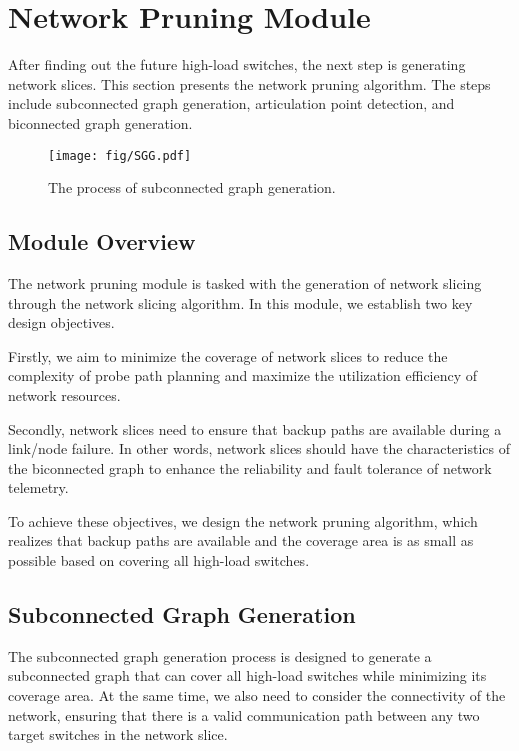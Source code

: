 \documentclass[journal]{IEEEtran}
\begin{document}
\vspace{-0.5em}
\section{Network Pruning Module}
\label{section5}
After finding out the future high-load switches, the next step is generating network slices. This section presents the network pruning algorithm. The steps include subconnected graph generation, articulation point detection, and biconnected graph generation.

\begin{figure*}[htbp]
\centering
\setlength{\abovecaptionskip}{0.cm}

\texttt{[image: fig/SGG.pdf]}
\caption{The process of subconnected graph generation. }
\label{fig6}
\vspace{-0.1cm}
\end{figure*}
\vspace{-1em}
\subsection{Module Overview}
The network pruning module is tasked with the generation of network slicing through the network slicing algorithm.   In this module, we establish two key design objectives.

Firstly, we aim to minimize the coverage of network slices to reduce the complexity of probe path planning and maximize the utilization efficiency of network resources.

Secondly, network slices need to ensure that backup paths are available during a link/node failure. In other words, network slices should have the characteristics of the biconnected graph to enhance the reliability and fault tolerance of network telemetry.

To achieve these objectives, we design the network pruning algorithm, which realizes that backup paths are available and the coverage area is as small as possible based on covering all high-load switches.





\vspace{-0.5em}
\subsection{Subconnected Graph Generation}

The subconnected graph generation process is designed to generate a subconnected graph that can cover all high-load switches while minimizing its coverage area. At the same time, we also need to consider the connectivity of the network, ensuring that there is a valid communication path between any two target switches in the network slice.
\end{document}
